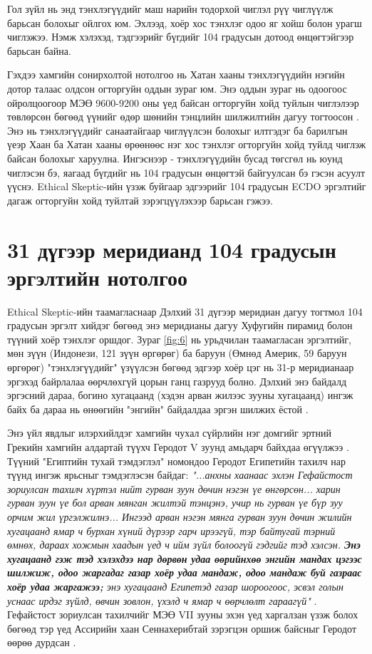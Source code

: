 \documentclass[10pt,twocolumn,letterpaper]{article}
\begin{document}
Гол зүйл нь энд тэнхлэгүүдийг маш нарийн тодорхой чиглэл рүү чиглүүлж барьсан болохыг ойлгох юм. Эхлээд, хоёр хос тэнхлэг одоо яг хойш болон урагш чиглэжээ. Нэмж хэлэхэд, тэдгээрийг бүгдийг 104 градусын дотоод өнцөгтэйгээр барьсан байна.

Гэхдээ хамгийн сонирхолтой нотолгоо нь Хатан хааны тэнхлэгүүдийн нэгийн дотор талаас олдсон огторгуйн оддын зураг юм. Энэ оддын зураг нь одоогоос ойролцоогоор МЭӨ 9600-9200 оны үед байсан огторгуйн хойд туйлын чиглэлээр төвлөрсөн бөгөөд үүнийг өдөр шөнийн тэнцлийн шилжилтийн дагуу тогтоосон \cite{28}. Энэ нь тэнхлэгүүдийг санаатайгаар чиглүүлсэн болохыг илтгэдэг ба барилгын үеэр Хаан ба Хатан хааны өрөөнөөс нэг хос тэнхлэг огторгуйн хойд туйлд чиглэж байсан болохыг харуулна. Ингэснээр - тэнхлэгүүдийн бусад төгсгөл нь юунд чиглэсэн бэ, яагаад бүгдийг нь 104 градусын өнцөгтэй байгуулсан бэ гэсэн асуулт үүснэ. Ethical Skeptic-ийн үзэж буйгаар эдгээрийг 104 градусын ECDO эргэлтийг дагаж огторгуйн хойд туйлтай зэрэгцүүлэхээр барьсан гэжээ.

\section{31 дүгээр меридианд 104 градусын эргэлтийн нотолгоо}

Ethical Skeptic-ийн таамагласнаар Дэлхий 31 дүгээр меридиан дагуу тогтмол 104 градусын эргэлт хийдэг бөгөөд энэ меридианы дагуу Хуфугийн пирамид болон түүний хоёр тэнхлэг оршдог. Зураг \ref{fig:6} нь урьдчилан таамагласан эргэлтийг, мөн зүүн (Индонези, 121 зүүн өргөрөг) ба баруун (Өмнөд Америк, 59 баруун өргөрөг) "тэнхлэгүүдийг" үзүүлсэн бөгөөд эдгээр хоёр цэг нь 31-р меридианаар эргэхэд байрлалаа өөрчлөхгүй цорын ганц газрууд болно. Дэлхий энэ байдалд эргэсний дараа, богино хугацаанд (хэдэн арван жилээс зууны хугацаанд) ингэж байх ба дараа нь өнөөгийн "энгийн" байдалдаа эргэн шилжих ёстой \cite{150}.

Энэ үйл явдлыг илэрхийлдэг хамгийн чухал сүйрлийн нэг домгийг эртний Грекийн хамгийн алдартай түүхч Геродот V зуунд амьдарч байхдаа өгүүлжээ \cite{31}. Түүний "Египтийн тухай тэмдэглэл" номондоо Геродот Египетийн тахилч нар түүнд ингэж ярьсныг тэмдэглэсэн байдаг: \textit{"...анхны хаанаас эхлэн Гефайстост зориулсан тахилч хүртэл нийт гурван зуун дөчин нэгэн үе өнгөрсөн... харин гурван зуун үе бол арван мянган жилтэй тэнцэнэ, учир нь гурван үе бүр зуу орчим жил үргэлжилнэ... Ингээд арван нэгэн мянга гурван зуун дөчин жилийн хугацаанд ямар ч бурхан хүний ​​дүрээр гарч ирээгүй, тэр байтугай тэрний өмнөх, дараах хожмын хаадын үед ч ийм зүйл болоогүй гэдгийг тэд хэлсэн. \textbf{Энэ хугацаанд гэж тэд хэлэхдээ нар дөрвөн удаа өөрийнхөө энгийн мандах цэгээс шилжиж, одоо жаргадаг газар хоёр удаа мандаж, одоо мандаж буй газраас хоёр удаа жаргажээ;} энэ хугацаанд Египетэд газар шороогоос, эсвэл голын уснаас ирдэг зүйлд, өвчин зовлон, үхэлд ч ямар ч өөрчлөлт гараагүй"} \cite{32}. Гефайстост зориулсан тахилчийг МЭӨ VII зууны эхэн үед харгалзан үзэж болох бөгөөд тэр үед Ассирийн хаан Сеннахерибтай зэрэгцэн оршиж байсныг Геродот өөрөө дурдсан \cite{32,33,34}.
\end{document}
